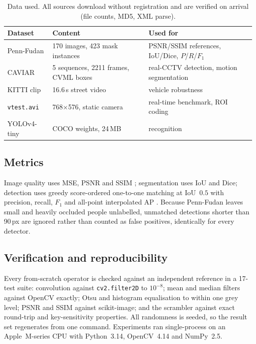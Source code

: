 \documentclass[conference,10pt]{IEEEtran}
\newcommand{\hdr}[1]{\textbf{#1}}
\begin{document}
\begin{table}[!t]
\caption{Data used. All sources download without registration and are verified
on arrival (file counts, MD5, XML parse).}
\label{tab:data}
\centering
\scriptsize
\begin{tabular}{@{}p{1.7cm}p{2.1cm}p{3.3cm}@{}}
\toprule
\hdr{Dataset} & \hdr{Content} & \hdr{Used for} \\
\midrule
Penn-Fudan \cite{wang2007pennfudan} & 170 images, 423 mask instances & PSNR/SSIM references, IoU/Dice, $P$/$R$/$F_1$ \\
CAVIAR \cite{caviar2004} & 5 sequences, 2211 frames, CVML boxes & real-CCTV detection, motion segmentation \\
KITTI clip \cite{geiger2012kitti} & 16.6\,s street video & vehicle robustness \\
\texttt{vtest.avi} & 768$\times$576, static camera & real-time benchmark, ROI coding \\
YOLOv4-tiny \cite{bochkovskiy2020} & COCO weights, 24\,MB & recognition \\
\bottomrule
\end{tabular}
\end{table}

\subsection{Metrics}
Image quality uses MSE, PSNR and SSIM \cite{wang2004ssim}; segmentation uses
IoU and Dice; detection uses greedy score-ordered one-to-one matching at
IoU~$0.5$ with precision, recall, $F_1$ and all-point interpolated AP
\cite{everingham2010voc}. Because Penn-Fudan leaves small and heavily occluded
people unlabelled, unmatched detections shorter than 90\,px are ignored rather
than counted as false positives, identically for every detector.

\subsection{Verification and reproducibility}
Every from-scratch operator is checked against an independent reference in a
17-test suite: convolution against \texttt{cv2.filter2D} to $10^{-8}$; mean and
median filters against OpenCV exactly; Otsu and histogram equalisation to
within one grey level; PSNR and SSIM against scikit-image; and the scrambler
against exact round-trip and key-sensitivity properties. All randomness is
seeded, so the result set regenerates from one command. Experiments ran
single-process on an Apple~M-series CPU with Python~3.14, OpenCV~4.14 and
NumPy~2.5.
\end{document}
